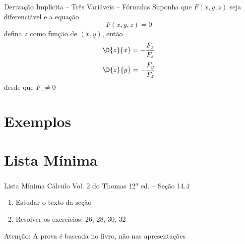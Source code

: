 \documentclass[fleqn,utf8,aspectratio=169,12pt]{beamer}
\begin{document}
\begin{frame}{Derivação Implícita -- Três Variáveis -- Fórmulas}
  Suponha que $F(x, y, z)$ seja diferenciável e a equação
  \[
    F(x, y, z) = 0
  \]
  defina $z$ como função de $(x, y)$, então
  \[
    \D{z}{x} = -\frac{F_x}{F_z}
  \]
  \[
    \D{z}{y} = -\frac{F_y}{F_z}
  \]
  desde que \(F_z \neq 0\)
\end{frame}



\section{Exemplos}




\section{Lista Mínima}

\begin{frame}{Lista Mínima}
  Cálculo Vol. 2 do Thomas 12\textsuperscript{a} ed. -- Seção 14.4
  \begin{enumerate}
    \item Estudar o texto da seção
    \item Resolver os exercícios: 26, 28, 30, 32
  \end{enumerate}

  \vfill
  Atenção: A prova é baseada no livro, não nas apresentações
\end{frame}

\end{document}
